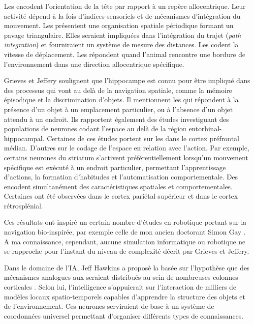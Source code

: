 Les  encodent l’orientation de la tête par rapport à un repère allocentrique. 
Leur activité dépend à la fois d’indices sensoriels et de mécanismes d’intégration du mouvement. 
Les  présentent une organisation spatiale périodique formant un pavage triangulaire. 
Elles seraient impliquées dans l’intégration du trajet (\emph{path integration}) et fourniraient un système de mesure des distances.
Les  codent la vitesse de déplacement.
Les  répondent quand l'animal rencontre une bordure de l'environnement dans une direction allocentrique spécifique. 

Grieves et Jeffery soulignent que l'hippocampe est connu pour être impliqué dans des processus qui vont au delà de la navigation spatiale, comme la mémoire épisodique et la discrimination d'objets. 
Il mentionnent les  qui répondent à la présence d'un objet à un emplacement particulier, ou à l'absence d'un objet attendu à un endroit. 
Ils rapportent également des études investiguant des populations de neurones codant l'espace au delà de la région entorhinal-hippocampal. Certaines de ces études portent sur les  dans le cortex préfrontal médian.
D'autres sur le codage de l’espace en relation avec l’action. 
Par exemple, certains neurones du striatum s’activent préférentiellement lorsqu'un mouvement spécifique est exécuté à un endroit particulier, permettant l’apprentissage d’actions, la formation d’habitudes et l’automatisation comportementale.
Des  encodent simultanément des caractéristiques spatiales et comportementales. 
Certaines ont été observées dans le cortex pariétal supérieur et dans le cortex rétrosplénial.


Ces résultats ont inspiré un certain nombre d'études en robotique portant sur la navigation bio-inspirée, 
par exemple celle de mon ancien doctorant Simon Gay \cite{gay_towards_2021}.
A ma connaissance, cependant, aucune simulation informatique ou robotique ne se rapproche pour l'instant du niveau de complexité décrit par Grieves et Jeffery.

Dans le domaine de l'IA, Jeff Hawkins a proposé la  basée sur l'hypothèse que des mécanismes analogues aux  seraient distribués au sein de nombreuses colonnes corticales  \cite{hawkins_framework_2019}. 
Selon lui, l’intelligence s'appuierait sur l’interaction de milliers de modèles locaux spatio-temporels capables d’apprendre la structure des objets et de l’environnement.
Ces neurones serviraient de base à  un système de coordonnées universel permettant d’organiser différents types de connaissances. 




